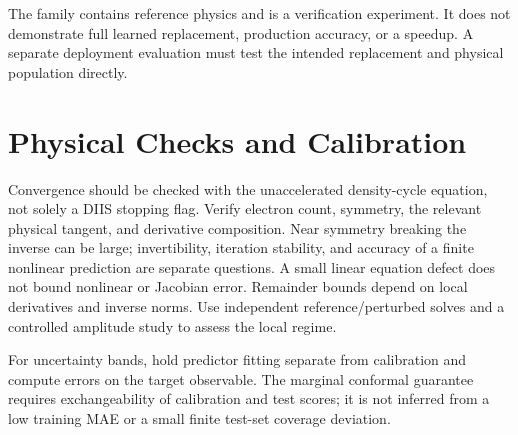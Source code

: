 The family contains reference physics and is a verification experiment.
It does not demonstrate full learned replacement, production accuracy, or a
speedup. A separate deployment evaluation must test the intended replacement
and physical population directly.

\section{Physical Checks and Calibration}
Convergence should be checked with the unaccelerated density-cycle equation,
not solely a DIIS stopping flag. Verify electron count, symmetry, the relevant
physical tangent, and derivative composition. Near symmetry breaking the
inverse can be large; invertibility, iteration stability, and accuracy of a
finite nonlinear prediction are separate questions.
A small linear equation defect does not bound nonlinear or Jacobian error.
Remainder bounds depend on local derivatives and inverse norms. Use independent reference/perturbed solves and a controlled
amplitude study to assess the local regime.

For uncertainty bands, hold predictor fitting separate from calibration and
compute errors on the target observable. The marginal conformal guarantee
requires exchangeability of calibration and test scores; it is not inferred
from a low training MAE or a small finite test-set coverage deviation.
